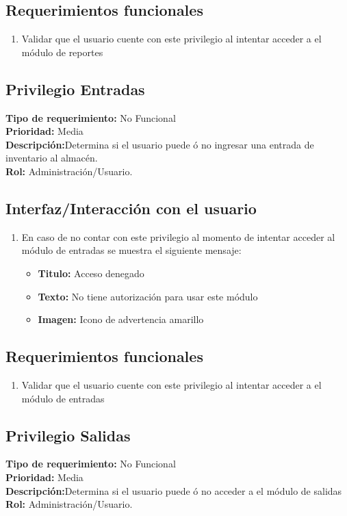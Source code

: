 \documentclass[a4paper,DIV=12]{scrreprt}
\begin{document}
\subsection*{Requerimientos funcionales}
\begin{enumerate}
	\item{Validar que el usuario cuente con este privilegio al intentar acceder a el módulo de reportes}
\end{enumerate}
\newpage
\setcounter{subsection}{1}
\subsection{Privilegio Entradas}
\noindent
\textbf{Tipo de requerimiento:} No Funcional\\
\textbf{Prioridad:} Media\\
\textbf{Descripción:}Determina si el usuario puede ó no ingresar una entrada de inventario al almacén.\\
\textbf{Rol:} Administración/Usuario.
\subsection*{Interfaz/Interacción con el usuario}
\begin{enumerate}
	\item{En caso de no contar con este privilegio al momento de intentar acceder al módulo de entradas se muestra el siguiente mensaje:}
	\begin{itemize}
		\item{\textbf{Titulo:} Acceso denegado}
		\item{\textbf{Texto:} No tiene autorización para usar este módulo}
		\item{\textbf{Imagen:} Icono de advertencia amarillo}
	\end{itemize}
\end{enumerate}
\subsection*{Requerimientos funcionales}
\begin{enumerate}
	\item{Validar que el usuario cuente con este privilegio al intentar acceder a el módulo de entradas}
\end{enumerate}
\newpage
\setcounter{subsection}{2}
\subsection{Privilegio Salidas}
\noindent
\textbf{Tipo de requerimiento:} No Funcional\\
\textbf{Prioridad:} Media\\
\textbf{Descripción:}Determina si el usuario puede ó no acceder a el módulo de salidas\\
\textbf{Rol:} Administración/Usuario.
\end{document}
